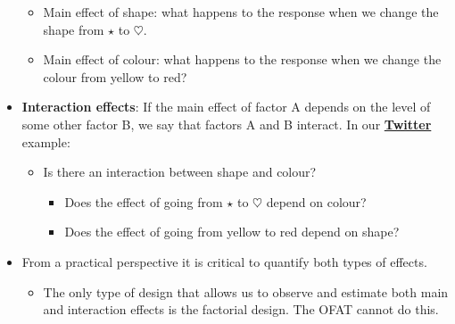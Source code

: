 \begin{itemize}
            \begin{itemize}
                  \item Main effect of shape: what happens to the response when we change the shape from $ \star $ to $ \heartsuit $.
                  \item Main effect of colour: what happens to the response when we change the colour from yellow to red?
            \end{itemize}
      \item \textbf{Interaction effects}: If the main effect of factor A depends on the level of some other factor B, we
            say that factors A and B interact. In our \hyperref[ex:twit_ex]{\textbf{Twitter}} example:
            \begin{itemize}
                  \item Is there an interaction between shape and colour?
                        \begin{itemize}[$\iff$]
                              \item Does the effect of going from $ \star $ to $ \heartsuit $ depend on colour?
                              \item Does the effect of going from yellow to red depend on shape?
                        \end{itemize}
            \end{itemize}
      \item From a practical perspective it is critical to quantify both types of effects.
            \begin{itemize}
                  \item The only type of design that allows us to observe and estimate both main and interaction effects
                        is the factorial design. The OFAT cannot do this.
            \end{itemize}
\end{itemize}
